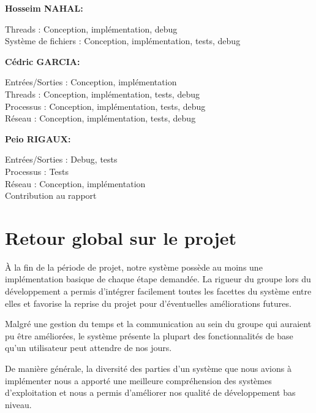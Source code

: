 \documentclass[12pt]{report}
\begin{document}
\textbf{Hosseim NAHAL:}

Threads : Conception, implémentation, debug\\
Système de fichiers : Conception, implémentation, tests, debug
\bigskip

\textbf{Cédric GARCIA:}

Entrées/Sorties : Conception, implémentation\\
Threads : Conception, implémentation, tests, debug\\
Processus : Conception, implémentation, tests, debug\\
Réseau : Conception, implémentation, tests, debug
\bigskip

\textbf{Peio RIGAUX:}

Entrées/Sorties : Debug, tests\\
Processus : Tests\\
Réseau : Conception, implémentation\\
Contribution au rapport




\chapter{Retour global sur le projet}

\`A la fin de la période de projet, notre système possède au moins une implémentation basique de chaque étape demandée. La rigueur du groupe lors du développement a permis d'intégrer facilement toutes les facettes du système entre elles et favorise la reprise du projet pour d'éventuelles améliorations futures.
\bigskip

Malgré une gestion du temps et la communication au sein du groupe qui auraient pu être améliorées, le système présente la plupart des fonctionnalités de base qu'un utilisateur peut attendre de nos jours.
\bigskip

De manière générale, la diversité des parties d'un système que nous avions à implémenter nous a apporté une meilleure compréhension des systèmes d'exploitation et nous a permis d'améliorer nos qualité de développement bas niveau.
\end{document}
